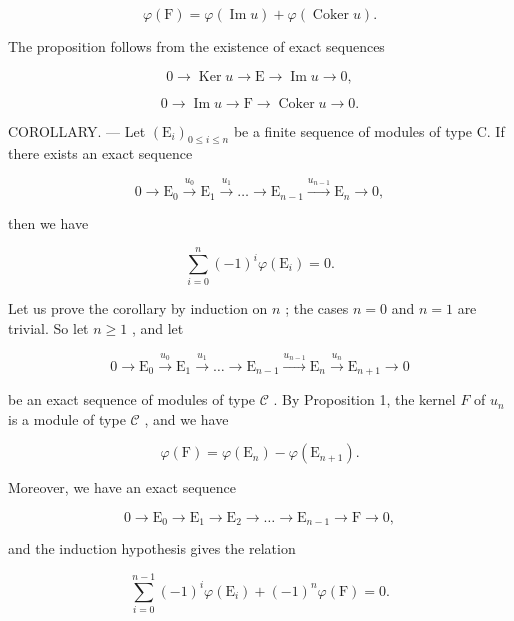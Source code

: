 \[
\varphi (\mathrm{F}) = \varphi (\operatorname{Im} u) + \varphi (\operatorname{Coker} u).\tag{3}
\]

The proposition follows from the existence of exact sequences

\[
0 \longrightarrow \operatorname{Ker} u \longrightarrow \mathrm{E} \longrightarrow \operatorname{Im} u \longrightarrow 0,
\]

\[
0 \longrightarrow \operatorname{Im} u \longrightarrow \mathrm{F} \longrightarrow \operatorname{Coker} u \longrightarrow 0.
\]

COROLLARY. --- Let \((\mathrm{E}_{i})_{0\leqslant i\leqslant n}\) be a finite sequence of modules of type C. If there exists an exact sequence

\[
0 \longrightarrow \mathrm{E} _ {0} \stackrel {u _ {0}} {\longrightarrow} \mathrm{E} _ {1} \stackrel {u _ {1}} {\longrightarrow} \dots \longrightarrow \mathrm{E} _ {n - 1} \stackrel {u _ {n - 1}} {\longrightarrow} \mathrm{E} _ {n} \longrightarrow 0,
\]

then we have

\[
\sum_ {i = 0} ^ {n} (- 1) ^ {i} \varphi (\mathrm{E} _ {i}) = 0.\tag{4}
\]

Let us prove the corollary by induction on \(n\) ; the cases \(n = 0\) and \(n = 1\) are trivial. So let \(n \geqslant 1\) , and let

\[
0 \longrightarrow \mathrm{E} _ {0} \stackrel {u _ {0}} {\longrightarrow} \mathrm{E} _ {1} \stackrel {u _ {1}} {\longrightarrow} \dots \longrightarrow \mathrm{E} _ {n - 1} \stackrel {u _ {n - 1}} {\longrightarrow} \mathrm{E} _ {n} \stackrel {u _ {n}} {\longrightarrow} \mathrm{E} _ {n + 1} \longrightarrow 0
\]

be an exact sequence of modules of type \(\mathcal{C}\) . By Proposition 1, the kernel \(F\) of \(u_{n}\) is a module of type \(\mathcal{C}\) , and we have

\[
\varphi (\mathrm{F}) = \varphi (\mathrm{E} _ {n}) - \varphi (\mathrm{E} _ {n + 1}).\tag{5}
\]

Moreover, we have an exact sequence

\[
0 \longrightarrow \mathrm{E} _ {0} \longrightarrow \mathrm{E} _ {1} \longrightarrow \mathrm{E} _ {2} \longrightarrow \dots \longrightarrow \mathrm{E} _ {n - 1} \longrightarrow \mathrm{F} \longrightarrow 0,
\]

and the induction hypothesis gives the relation

\[
\sum_ {i = 0} ^ {n - 1} (- 1) ^ {i} \varphi (\mathrm{E} _ {i}) + (- 1) ^ {n} \varphi (\mathrm{F}) = 0.\tag{6}
\]

